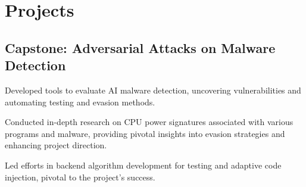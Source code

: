 
\section{Projects}


\subsection{Capstone: Adversarial Attacks on Malware Detection}
\begin{tightitemize}

\item Developed tools to evaluate AI malware detection, uncovering vulnerabilities and automating testing and evasion methods. %
\item Conducted in-depth research on CPU power signatures associated with various programs and malware, providing pivotal insights into evasion strategies and enhancing project direction. %
\item Led efforts in backend algorithm development for testing and adaptive code injection, pivotal to the project's success. %

\end{tightitemize}

\sectionspace %





